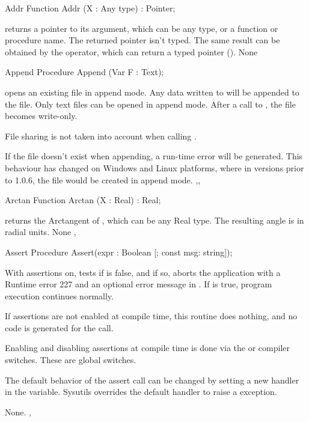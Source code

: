 \begin{function}{Addr}
\Declaration
Function Addr (X : Any type) : Pointer;

\Description
{} returns a pointer to its argument, which can be any type, or a
function or procedure name. The returned pointer isn't typed.
The same result can be obtained by the  operator, which can return a
typed pointer (\progref).
\Errors
None
\SeeAlso
{}
\end{function}


\begin{procedure}{Append}
\Declaration
Procedure Append (Var F : Text);

\Description
{} opens an existing file in append mode. Any data written to
 will be appended to the file. Only text files can be opened in
append mode. After a call to , the file  becomes
write-only.

File sharing is not taken into account when calling .

\Errors
If the file doesn't exist when appending, a run-time error will be generated.
This behaviour has changed on Windows and Linux platforms, where in versions
prior to 1.0.6, the file would be created in append mode.
\SeeAlso
{},, 
\end{procedure}


\begin{function}{Arctan}
\Declaration
Function Arctan (X : Real) : Real;

\Description
{} returns the Arctangent of , which can be any Real type.
The resulting angle is in radial units.
\Errors
None
\SeeAlso
{}, 
\end{function}


\begin{procedure}{Assert}
\Declaration
Procedure Assert(expr : Boolean [; const msg: string]);

\Description
With assertions on,  tests if  is 
false, and if so, aborts the application with a Runtime error 
227 and an optional error message in .
If  is true, program execution continues normally. 

If assertions are not enabled at compile time, this routine does 
nothing, and no code is generated for the  call. 

Enabling and disabling assertions at compile time is done via
the  or  compiler switches. These are
global switches.

The default behavior of the assert call can be changed by 
setting a new handler in the  variable.
Sysutils overrides the default handler to raise a  
exception.


\Errors
None.
\SeeAlso
{}, 
\end{procedure}


